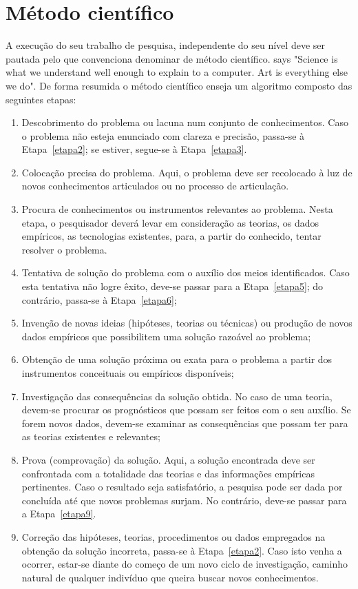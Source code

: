 \section{Método científico}
A execução do seu trabalho de pesquisa, independente do seu nível deve ser pautada pelo que convenciona denominar de método científico. 
\citeauthor{knuth:tex} says "Science is what we understand well enough to explain to a computer. Art is everything else we do". De forma resumida o método científico enseja um algoritmo composto das seguintes etapas:

\begin{enumerate}
\item \label{etapa1} Descobrimento do problema ou lacuna num conjunto de conhecimentos.  Caso o problema não esteja enunciado com clareza e precisão, passa-se à Etapa~\ref{etapa2}; se estiver, segue-se à Etapa~\ref{etapa3}.
\item \label{etapa2} Colocação precisa do problema. Aqui, o problema deve ser recolocado à luz de novos conhecimentos articulados ou no processo de articulação.
\item \label{etapa3} Procura de conhecimentos ou instrumentos relevantes ao problema.  Nesta etapa, o pesquisador deverá levar em consideração as teorias, os dados empíricos, as tecnologias existentes, para, a partir do conhecido, tentar resolver o problema. 
\item \label{etapa4} Tentativa de solução do problema com o auxílio dos meios identificados.  Caso esta tentativa não logre êxito, deve-se passar para a Etapa~\ref{etapa5}; do contrário, passa-se à Etapa~\ref{etapa6};
\item \label{etapa5} Invenção de novas ideias (hipóteses, teorias ou técnicas) ou produção de novos dados empíricos que possibilitem uma solução razoável ao problema;
\item \label{etapa6} Obtenção de uma solução próxima ou exata para o problema a partir dos instrumentos conceituais ou empíricos disponíveis;
\item \label{etapa7} Investigação das consequências da solução obtida. No caso de uma teoria, devem-se procurar os prognósticos que possam ser feitos com o seu auxílio. Se forem novos dados, devem-se examinar as consequências que possam ter para as teorias existentes e relevantes;
\item \label{etapa8} Prova (comprovação) da solução. Aqui, a solução encontrada deve ser confrontada com a totalidade das teorias e das informações empíricas pertinentes. Caso o resultado seja satisfatório, a pesquisa pode ser dada por concluída até que novos problemas surjam. No contrário, deve-se passar para a Etapa~\ref{etapa9}.
\item \label{etapa9} Correção das hipóteses, teorias, procedimentos ou dados empregados na obtenção da solução incorreta, passa-se à Etapa~\ref{etapa2}. Caso isto venha a ocorrer, estar-se diante do começo de um novo ciclo de investigação, caminho natural de qualquer indivíduo que queira buscar novos conhecimentos.
\end{enumerate}


